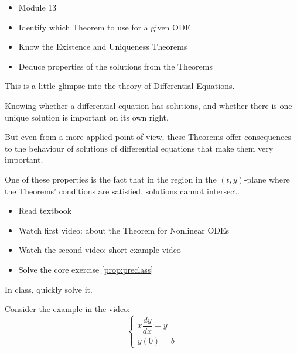 \begin{lesson}

	\begin{itemize}
		\item Module 13
	\end{itemize}

	\begin{itemize}
		\item Identify which Theorem to use for a given ODE
		\item Know the Existence and Uniqueness Theorems
		\item Deduce properties of the solutions from the Theorems
	\end{itemize}
	

This is a little glimpse into the theory of Differential Equations. 

Knowing whether a differential equation has solutions, and whether there is one unique solution is important on its own right.

But even from a more applied point-of-view, these Theorems offer consequences to the behaviour of solutions of differential equations that make them very important. 

One of these properties is the fact that in the region in the $(t,y)$-plane where the Theorems' conditions are satisfied, solutions cannot intersect.


\begin{itemize}
	\item Read textbook
	\item Watch first video: about the Theorem for Nonlinear ODEs
	\item Watch the second video: short example video
	\item Solve the core exercise \ref{prop:preclass}
\end{itemize}


\end{lesson}






\begin{annotation}
\begin{goals}
	In class, quickly solve it.
\end{goals}	
\end{annotation}
\question \label{prop:preclass}Consider the example in the video:
$$
\begin{cases}
x \dfrac{dy}{dx} = y \\
y(0)=b
\end{cases}
$$

